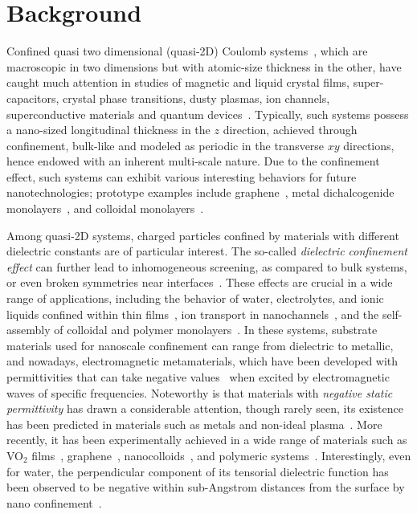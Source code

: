 \section{Background}

Confined quasi two dimensional (quasi-2D) Coulomb systems~\cite{mazars2011long}, which are macroscopic in two dimensions but with atomic-size thickness in the other, have caught much attention in studies of magnetic and liquid crystal films, super-capacitors, crystal phase transitions, dusty plasmas, ion channels, superconductive materials and quantum devices~\cite{kawamoto2002history, hille2001ionic, teng2003microscopic, Messina2017PRL, mazars2011long, saito2016highly, liu20192d}. 
Typically, such systems possess a nano-sized longitudinal thickness in the $z$ direction, achieved through confinement, bulk-like and modeled as periodic in the transverse $xy$ directions, hence endowed with an inherent multi-scale nature.
Due to the confinement effect, such systems can exhibit various interesting behaviors for future nanotechnologies; prototype examples include graphene~\cite{novoselov2004electric}, metal dichalcogenide monolayers~\cite{kumar2012tunable}, and colloidal monolayers~\cite{mangold2003phase}.

Among quasi-2D systems, charged particles confined by materials with different dielectric constants are of particular interest. 
The so-called \emph{dielectric confinement effect} can further lead to inhomogeneous screening, as compared to bulk systems, or even broken symmetries near interfaces~\cite{C0NR00698J,wang2016inhomogeneous,gao2024broken}.
These effects are crucial in a wide range of applications, including the behavior of water, electrolytes, and ionic liquids confined within thin films~\cite{raviv2001fluidity}, ion transport in nanochannels~\cite{zhu2019ion}, and the self-assembly of colloidal and polymer monolayers~\cite{kim2017imaging}.
In these systems, substrate materials used for nanoscale confinement can range from dielectric to metallic, and nowadays, electromagnetic metamaterials, which have been developed with permittivities that can take negative values~\cite{veselago1967electrodynamics, smith2004metamaterials, cheng2017tunable, xie2022recent, xu2020polyaniline} when excited by electromagnetic waves of specific frequencies.  
Noteworthy is that materials with \emph{negative static permittivity}  has drawn a considerable attention, though rarely seen, its existence has been predicted in materials such as metals and non-ideal plasma~\cite{Dolgov1918admissible,homes2001optical}. More recently, it has been experimentally achieved in a wide range of materials such as VO$_2$ films~\cite{kana2016thermally}, graphene~\cite{nazarov2015negative}, nanocolloids~\cite{shulman2007plasmalike}, and polymeric systems~\cite{yan2013negative}.
Interestingly, even for water, the perpendicular component of its tensorial dielectric function has been observed to be negative within sub-Angstrom distances from the surface by nano confinement~\cite{Kornyshev1996Static, Schlaich2016Water, Kornyshev2021Nonlocal}.



